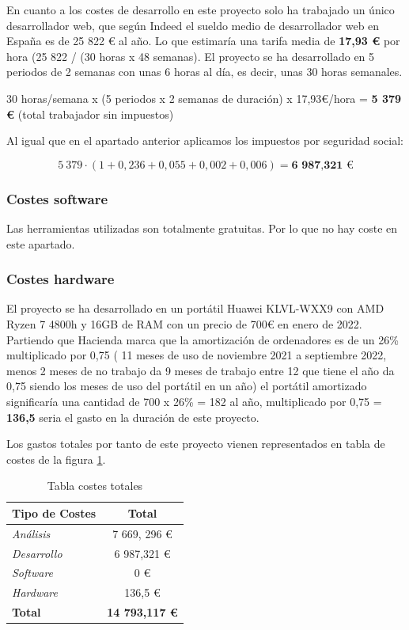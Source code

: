 En cuanto a los costes de desarrollo en este proyecto solo ha trabajado un único desarrollador web, que según Indeed \cite{indeed:oficial} el sueldo medio de desarrollador web en España es de 25 822 € al año. Lo que estimaría una tarifa media de \textbf{17,93 €} por hora (25 822 / (30 horas x 48 semanas). El proyecto se ha desarrollado en 5 periodos de 2 semanas con unas 6 horas al día, es decir, unas 30 horas semanales. 

30 horas/semana x (5 periodos x 2 semanas de duración) x 17,93€/hora = \textbf{5 379 €} (total trabajador sin impuestos)

Al igual que en el apartado anterior aplicamos los impuestos por seguridad social:

$$ 5\:379 \cdot (1 + 0,236 + 0,055 + 0,002 + 0,006) = \textbf{6 987,321 €} $$


\subsubsection{Costes software}

Las herramientas utilizadas son totalmente gratuitas. Por lo que no hay coste en este apartado. 

\subsubsection{Costes hardware}

El proyecto se ha desarrollado en un portátil Huawei KLVL-WXX9 con AMD Ryzen 7 4800h y 16GB de RAM con un precio de 700€ en enero de 2022. Partiendo que Hacienda marca que la amortización de ordenadores es de un 26\% multiplicado por 0,75 ( 11 meses de uso de noviembre 2021 a septiembre 2022, menos 2 meses de no trabajo da 9 meses de trabajo entre 12 que tiene el año da 0,75 siendo los meses de uso del portátil en un año) el portátil amortizado significaría una cantidad de 700 x 26\% = 182 al año, multiplicado por 0,75 = \textbf{136,5} seria el gasto en la duración de este proyecto.

Los gastos totales por tanto de este proyecto vienen representados en tabla de costes de la figura \ref{fig:costes_totales}.

\begin{table}[h]
    \centering
    \begin{tabular}{l c}
         \textbf{Tipo de Costes} & \textbf{Total } \\ 
         \hline
         \textit{Análisis} & 7 669, 296 € \\ 
         \textit{Desarrollo} & 6 987,321 € \\  
         \textit{Software} & 0 € \\ 
         \textit{Hardware} & 136,5 €   \\ 
         \hline
         \textbf{Total} & \textbf{14 793,117 €}\\ 
    \end{tabular}
    \caption{Tabla costes totales}
    \label{fig:costes_totales}
\end{table}


